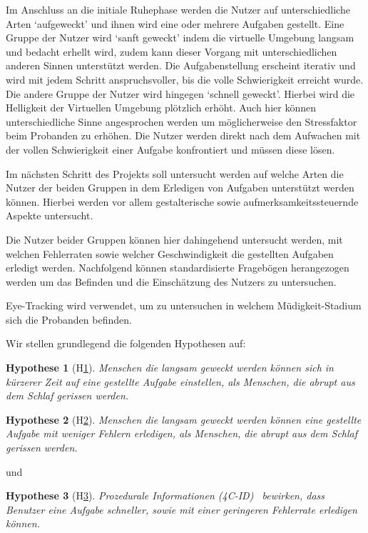 \documentclass[a4paper, 11pt]{article}
\newtheorem{hyp}{Hypothese}
\begin{document}
Im Anschluss an die initiale Ruhephase werden die Nutzer auf unterschiedliche Arten `auf\-geweckt' und ihnen wird eine oder mehrere Aufgaben gestellt. Eine Gruppe der Nutzer wird `sanft geweckt' indem die virtuelle Umgebung langsam und bedacht erhellt wird, zudem kann dieser Vorgang mit unterschiedlichen anderen Sinnen unterstützt werden. Die Aufgabenstellung erscheint iterativ und wird mit jedem Schritt anspruchsvoller, bis die volle Schwierigkeit erreicht wurde. 
Die andere Gruppe der Nutzer wird hingegen `schnell geweckt'. Hierbei wird die Helligkeit der Virtuellen Umgebung plötzlich erhöht. Auch hier können unterschiedliche Sinne angesprochen werden um möglicherweise den Stressfaktor beim Probanden zu erhöhen. Die Nutzer werden direkt nach dem Aufwachen mit der vollen Schwierigkeit einer Aufgabe konfrontiert und müssen diese lösen.

Im nächsten Schritt des Projekts soll untersucht werden auf welche Arten die Nutzer der beiden Gruppen in dem Erledigen von Aufgaben unterstützt werden können. Hierbei werden vor allem gestalterische sowie aufmerksamkeitssteuernde Aspekte untersucht. 

Die Nutzer beider Gruppen können hier dahingehend untersucht werden, mit welchen Fehlerraten sowie welcher Geschwindigkeit die gestellten Aufgaben erledigt werden. Nachfolgend können standardisierte Fragebögen herangezogen werden um das Befinden und die Einschätzung des Nutzers zu untersuchen.

Eye-Tracking wird verwendet, um zu untersuchen in welchem Müdigkeit-Stadium sich die Probanden befinden.

Wir stellen grundlegend die folgenden Hypothesen auf:
\begin{hyp}[H\ref{hyp:schneller}]\label{hyp:schneller}
	Menschen die langsam geweckt werden können sich in kürzerer Zeit auf eine gestellte Aufgabe einstellen, als Menschen, die abrupt aus dem Schlaf gerissen werden.
\end{hyp}

\begin{hyp}[H\ref{hyp:erfolgreicher}]\label{hyp:erfolgreicher}
	Menschen die langsam geweckt werden können eine gestellte Aufgabe mit weniger Fehlern erledigen, als Menschen, die abrupt aus dem Schlaf gerissen werden.
\end{hyp}

und

\begin{hyp}[H\ref{hyp:gestaltung}]\label{hyp:gestaltung}
    Prozedurale Informationen (4C-ID)~\cite{van2002blueprints} bewirken, dass Benutzer eine Aufgabe schneller, sowie mit einer geringeren Fehlerrate erledigen können.
\end{hyp}
\end{document}
